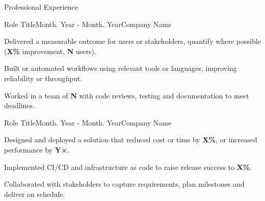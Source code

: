 \begin{rSection}{\normalsize Professional Experience} \itemsep -3pt

\begin{rSubsection}{Role Title}{Month. Year - Month. Year}{Company Name}{}
\item Delivered a measurable outcome for users or stakeholders, quantify where possible (\textbf{X\%} improvement, \textbf{N} users).
\item Built or automated workflows using relevant tools or languages, improving reliability or throughput.
\item Worked in a team of \textbf{N} with code reviews, testing and documentation to meet deadlines.
\end{rSubsection}

\begin{rSubsection}{Role Title}{Month. Year - Month. Year}{Company Name}{}
\item Designed and deployed a solution that reduced cost or time by \textbf{X\%}, or increased performance by \textbf{Y×}.
\item Implemented CI/CD and infrastructure as code to raise release success to \textbf{X\%}.
\item Collaborated with stakeholders to capture requirements, plan milestones and deliver on schedule.
\end{rSubsection}

\vspace{-0.2cm}
\end{rSection}
